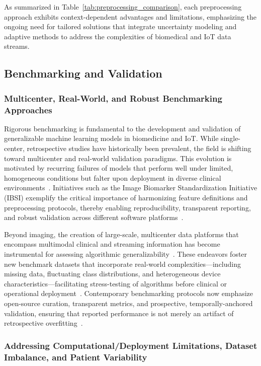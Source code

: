 \documentclass[sigconf]{acmart}
\begin{document}
As summarized in Table~\ref{tab:preprocessing_comparison}, each preprocessing approach exhibits context-dependent advantages and limitations, emphasizing the ongoing need for tailored solutions that integrate uncertainty modeling and adaptive methods to address the complexities of biomedical and IoT data streams.

\subsection{Benchmarking and Validation}

\subsubsection{Multicenter, Real-World, and Robust Benchmarking Approaches}

Rigorous benchmarking is fundamental to the development and validation of generalizable machine learning models in biomedicine and IoT. While single-center, retrospective studies have historically been prevalent, the field is shifting toward multicenter and real-world validation paradigms. This evolution is motivated by recurring failures of models that perform well under limited, homogeneous conditions but falter upon deployment in diverse clinical environments~\cite{ref31,ref33,ref44}. Initiatives such as the Image Biomarker Standardization Initiative (IBSI) exemplify the critical importance of harmonizing feature definitions and preprocessing protocols, thereby enabling reproducibility, transparent reporting, and robust validation across different software platforms~\cite{ref49,ref50,ref54}.

Beyond imaging, the creation of large-scale, multicenter data platforms that encompass multimodal clinical and streaming information has become instrumental for assessing algorithmic generalizability~\cite{ref34,ref35,ref37,ref45,ref48,ref65,ref83}. These endeavors foster new benchmark datasets that incorporate real-world complexities—including missing data, fluctuating class distributions, and heterogeneous device characteristics—facilitating stress-testing of algorithms before clinical or operational deployment~\cite{ref83}. Contemporary benchmarking protocols now emphasize open-source curation, transparent metrics, and prospective, temporally-anchored validation, ensuring that reported performance is not merely an artifact of retrospective overfitting~\cite{ref31,ref44,ref54}.

\subsubsection{Addressing Computational/Deployment Limitations, Dataset Imbalance, and Patient Variability}
\end{document}
